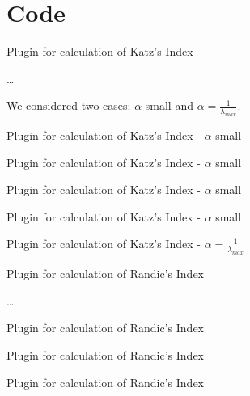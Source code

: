 \section{Code}
\begin{frame}{Plugin for calculation of Katz's Index}
\begin{definition}
\dots
\end{definition}
We considered two cases: $\alpha$ small and $\alpha = \frac{1}{\lambda_{max}}$.
\end{frame}
\begin{frame}{Plugin for calculation of Katz's Index - $\alpha$ small}

\end{frame}
\begin{frame}{Plugin for calculation of Katz's Index - $\alpha$ small}

\end{frame}
\begin{frame}{Plugin for calculation of Katz's Index - $\alpha$ small}

\end{frame}
\begin{frame}{Plugin for calculation of Katz's Index - $\alpha$ small}

\end{frame}
\begin{frame}{Plugin for calculation of Katz's Index - $\alpha = \frac{1}{\lambda_{max}}$}

\end{frame}

\begin{frame}{Plugin for calculation of Randic's Index}
\begin{definition}
\dots
\end{definition}
\end{frame}
\begin{frame}{Plugin for calculation of Randic's Index}

\end{frame}
\begin{frame}{Plugin for calculation of Randic's Index}

\end{frame}
\begin{frame}{Plugin for calculation of Randic's Index}

\end{frame}
